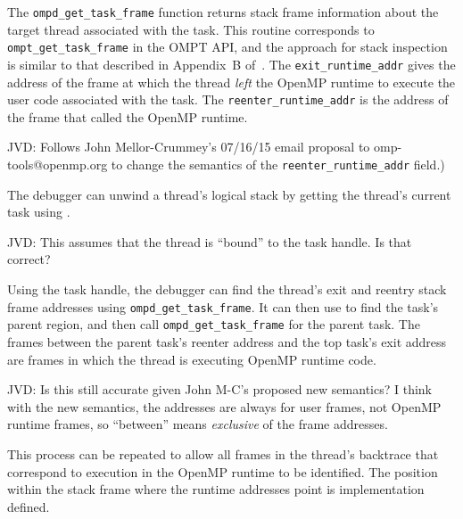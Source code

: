 The \verb|ompd_get_task_frame| function returns stack frame
information about the target thread associated with the task.
%
This routine corresponds to \verb|ompt_get_task_frame| in the OMPT
API, and the approach for stack inspection is similar to that
described in Appendix~B of~\cite{ompt-tr2}.
%
The \verb|exit_runtime_addr| gives the address of the frame at which
the thread \emph{left} the OpenMP runtime to execute the user code
associated with the task.
%
The \verb|reenter_runtime_addr| is the address of the frame that
called the OpenMP runtime.
\begin{notes}
JVD: Follows John Mellor-Crummey's
07/16/15 email proposal to omp-tools@openmp.org to change the
semantics of the \verb|reenter_runtime_addr| field.)
\end{notes}
%
The debugger can unwind a thread's logical stack by getting the
thread's current task using
.
\begin{notes}
JVD: This assumes that the thread is ``bound'' to the task
handle. Is that correct?
\end{notes}
%
Using the task handle, the debugger can find the thread's exit and
reentry stack frame addresses using \texttt{ompd\_get\_task\_frame}.
%
It can then use
to find the task's parent region, and then call \verb|ompd_get_task_frame|
for the parent task.
%
The frames between the parent task's reenter address and the top
task's exit address are frames in which the thread is executing OpenMP
runtime code.
\begin{notes}
JVD: Is this still accurate given John M-C's
proposed new semantics? I think with the new semantics, the addresses
are always for user frames, not OpenMP runtime frames, so ``between''
means \emph{exclusive} of the frame addresses.
\end{notes}
%
This process can be repeated to allow all frames in the thread's
backtrace that correspond to execution in the OpenMP runtime to be
identified.
%
The position within the stack frame where the runtime addresses point
is implementation defined.